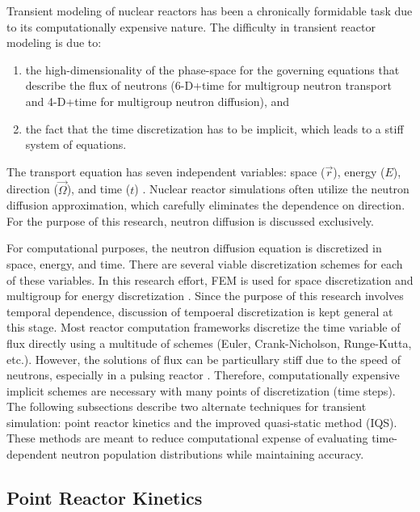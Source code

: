 Transient modeling of nuclear reactors has been a chronically formidable task due to its computationally expensive nature. The difficulty in transient reactor modeling is due to:
\begin{enumerate}
\item
the high-dimensionality of the phase-space for the governing equations that describe the flux of neutrons (6-D+time for multigroup neutron transport and 4-D+time for multigroup neutron diffusion), and 
\item
the fact that the time discretization has to be implicit, which  leads to a stiff system of equations.  
\end{enumerate}
The transport equation has seven independent variables: space ($\vec{r}$), energy ($E$), direction ($\vec{\Omega}$), and time ($t$) \cite{duderstadt1976nuclear}.  Nuclear reactor simulations often utilize the neutron diffusion approximation, which carefully eliminates the dependence on direction.  For the purpose of this research, neutron diffusion is discussed exclusively.

For computational purposes, the neutron diffusion equation is discretized in space, energy, and time.  There are several viable discretization schemes for each of these variables. In this research effort, FEM is used for space discretization and multigroup for energy discretization \cite{zeinkiewicz2005finite, duderstadt1976nuclear}. Since the purpose of this research involves temporal dependence, discussion of tempoeral discretization is kept general at this stage.  Most reactor computation frameworks discretize the time variable of flux directly using a multitude of schemes (Euler, Crank-Nicholson, Runge-Kutta, etc.).  However, the solutions of flux can be particullary stiff due to the speed of neutrons, especially in a pulsing reactor \cite{TWIGL_benchmark}. Therefore, computationally expensive implicit schemes are necessary with many points of discretization (time steps). The following subsections describe two alternate techniques for transient simulation: point reactor kinetics and the improved quasi-static method (IQS). These methods are meant to reduce computational expense of evaluating time-dependent neutron population distributions while maintaining accuracy.

\subsection{Point Reactor Kinetics}

